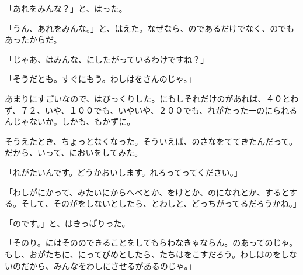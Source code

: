 「あれをみんな？」と、はった。

「うん、あれをみんな。」と、はえた。なぜなら、のであるだけでなく、のでもあったからだ。

「じゃあ、はみんな、にしたがっているわけですね？」

「そうだとも。すぐにもう。わしはをさんのじゃ。」

あまりにすごいなので、はびっくりした。にもしそれだけのがあれば、４０とわず、７２、いや、１００でも、いやいや、２００でも、れがたった一のにられるんじゃないか。しかも、もかずに。

そうえたとき、ちょっとなくなった。そういえば、のさなをててきたんだって。だから、いって、においをしてみた。

「れがたいんです。どうかおいします。れろってってください。」

「わしがにかって、みたいにからへべとか、をけとか、のになれとか、するとする。そして、そのがをしないとしたら、とわしと、どっちがってるだろうかね。」

「のです。」と、はきっぱりった。

「そのり。にはそののできることをしてもらわなきゃならん。のあってのじゃ。もし、おがたちに、にってびめとしたら、たちはをこすだろう。わしはのをしないのだから、みんなをわしにさせるがあるのじゃ。」

